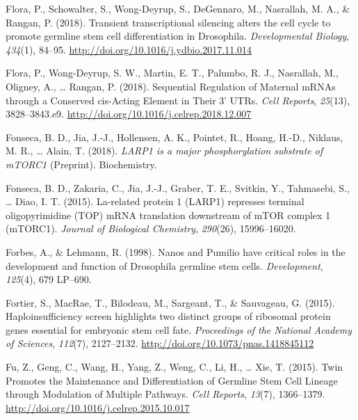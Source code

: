 \documentclass[12pt,twoside]{reedthesis}
\newlength{\cslhangindent}
\newenvironment{cslreferences}%
  {\setlength{\parindent}{0pt}%
  \everypar{\setlength{\hangindent}{\cslhangindent}}\ignorespaces}%
  {\par}
\begin{document}
\begin{cslreferences}
\leavevmode\hypertarget{ref-Flora2018l}{}%
Flora, P., Schowalter, S., Wong-Deyrup, S., DeGennaro, M., Nasrallah, M. A., \& Rangan, P. (2018). Transient transcriptional silencing alters the cell cycle to promote germline stem cell differentiation in Drosophila. \emph{Developmental Biology}, \emph{434}(1), 84--95. \url{http://doi.org/10.1016/j.ydbio.2017.11.014}

\leavevmode\hypertarget{ref-Flora2018k}{}%
Flora, P., Wong-Deyrup, S. W., Martin, E. T., Palumbo, R. J., Nasrallah, M., Oligney, A., \ldots{} Rangan, P. (2018). Sequential Regulation of Maternal mRNAs through a Conserved cis-Acting Element in Their 3' UTRs. \emph{Cell Reports}, \emph{25}(13), 3828--3843.e9. \url{http://doi.org/10.1016/j.celrep.2018.12.007}

\leavevmode\hypertarget{ref-fonsecaLARP1MajorPhosphorylation2018}{}%
Fonseca, B. D., Jia, J.-J., Hollensen, A. K., Pointet, R., Hoang, H.-D., Niklaus, M. R., \ldots{} Alain, T. (2018). \emph{LARP1 is a major phosphorylation substrate of mTORC1} (Preprint). Biochemistry.

\leavevmode\hypertarget{ref-Fonseca2015a}{}%
Fonseca, B. D., Zakaria, C., Jia, J.-J., Graber, T. E., Svitkin, Y., Tahmasebi, S., \ldots{} Diao, I. T. (2015). La-related protein 1 (LARP1) represses terminal oligopyrimidine (TOP) mRNA translation downstream of mTOR complex 1 (mTORC1). \emph{Journal of Biological Chemistry}, \emph{290}(26), 15996--16020.

\leavevmode\hypertarget{ref-Forbes1998g}{}%
Forbes, A., \& Lehmann, R. (1998). Nanos and Pumilio have critical roles in the development and function of Drosophila germline stem cells. \emph{Development}, \emph{125}(4), 679 LP--690.

\leavevmode\hypertarget{ref-fortierHaploinsufficiencyScreenHighlights2015}{}%
Fortier, S., MacRae, T., Bilodeau, M., Sargeant, T., \& Sauvageau, G. (2015). Haploinsufficiency screen highlights two distinct groups of ribosomal protein genes essential for embryonic stem cell fate. \emph{Proceedings of the National Academy of Sciences}, \emph{112}(7), 2127--2132. \url{http://doi.org/10.1073/pnas.1418845112}

\leavevmode\hypertarget{ref-Fu2015h}{}%
Fu, Z., Geng, C., Wang, H., Yang, Z., Weng, C., Li, H., \ldots{} Xie, T. (2015). Twin Promotes the Maintenance and Differentiation of Germline Stem Cell Lineage through Modulation of Multiple Pathways. \emph{Cell Reports}, \emph{13}(7), 1366--1379. \url{http://doi.org/10.1016/j.celrep.2015.10.017}


\end{cslreferences}
\end{document}
